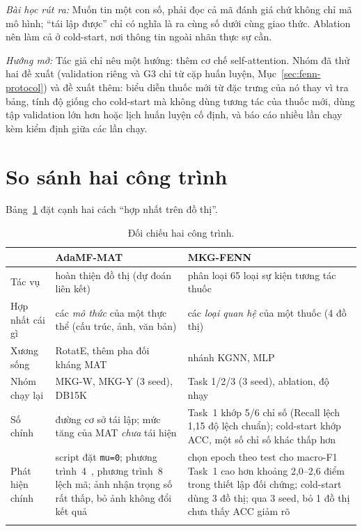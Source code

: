 \documentclass[conference]{IEEEtran}
\newcommand{\hlg}[1]{{\sethlcolor{hlgreen}\hl{#1}}}
\renewcommand{\hl}[1]{#1}
\begin{document}
\textit{Bài học rút ra:} Muốn tin một con số, phải đọc cả mã đánh giá chứ không chỉ mã mô hình; ``tái lập
được'' chỉ có nghĩa là ra cùng số dưới cùng giao thức. Ablation nên làm cả ở cold-start, nơi thông
tin ngoài nhãn thực sự cần.

\textit{Hướng mở:} Tác giả chỉ nêu một hướng: thêm cơ chế self-attention. Nhóm đã thử hai đề xuất
(validation riêng và G3 chỉ từ cặp huấn luyện, Mục~\ref{sec:fenn-protocol}) và đề xuất thêm: biểu diễn
thuốc mới từ đặc trưng của nó thay vì tra bảng, tính độ giống cho cold-start mà không dùng tương tác
của thuốc mới, dùng tập validation lớn hơn hoặc lịch huấn luyện cố định, và báo cáo nhiều lần chạy kèm
kiểm định giữa các lần chạy.

\section{So sánh hai công trình}
Bảng~\ref{tab:compare} đặt cạnh hai cách ``hợp nhất trên đồ thị''.

\begin{table}[t]
\caption{Đối chiếu hai công trình.}
\label{tab:compare}
\centering
\footnotesize
\renewcommand{\arraystretch}{1.15}
\begin{tabular}{>{\raggedright\arraybackslash}p{1.5cm} >{\raggedright\arraybackslash}p{2.95cm} >{\raggedright\arraybackslash}p{2.95cm}}
\toprule
& AdaMF-MAT & MKG-FENN \\
\midrule
Tác vụ & hoàn thiện đồ thị (dự đoán liên kết) & phân loại 65 loại sự kiện tương tác thuốc \\ \addlinespace[2pt]
Hợp nhất cái gì & các \emph{mô thức} của một thực thể (cấu trúc, ảnh, văn bản) & các \emph{loại quan hệ} của một thuốc (4 đồ thị) \\ \addlinespace[2pt]
Xương sống & RotatE, thêm pha đối kháng MAT & 4 nhánh KGNN, MLP \\ \addlinespace[2pt]
Nhóm chạy lại & MKG-W, MKG-Y (3 seed), DB15K & Task 1/2/3 (3 seed), ablation, độ nhạy \\ \addlinespace[2pt]
Số chính & đường cơ sở tái lập; mức tăng của MAT \emph{chưa} tái hiện & Task~1 \hlg{khớp 5/6 chỉ số (Recall lệch 1,15 độ lệch chuẩn)}; cold-start khớp ACC, một số chỉ số khác thấp hơn \\ \addlinespace[2pt]
Phát hiện chính & script đặt \texttt{mu=0}; phương trình~4~\cite{adamfmat}, phương trình~8~\cite{adamfmat} lệch mã; ảnh nhận trọng số rất thấp, bỏ ảnh không đổi kết quả & chọn epoch theo test \hlg{cho macro-F1 Task~1 cao hơn} khoảng 2,0--2,6 điểm \hlg{trong thiết lập đối chứng}; cold-start dùng 3 đồ thị; qua 3 seed, bỏ 1 đồ thị \hlg{chưa thấy ACC giảm rõ} \\ \addlinespace[2pt]
\bottomrule
\end{tabular}
\end{table}
\end{document}
